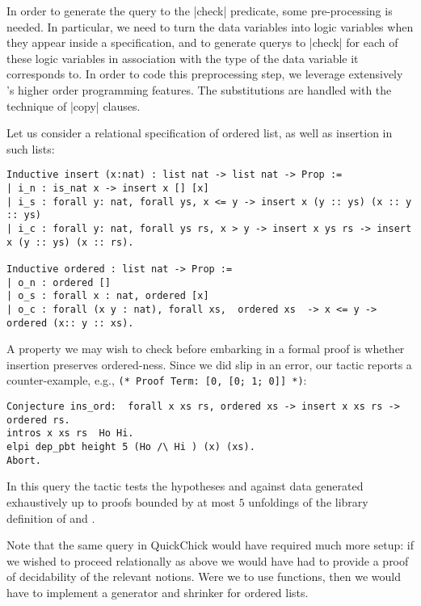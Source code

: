 In order to generate the query to the \lsti|check| predicate, some pre-processing is needed. In particular, we need to
turn the data variables into \lP logic variables when they appear inside a specification, and to generate querys to
\lsti|check| for each of these logic variables in association with the type of the data variable it corresponds to.
In order to code this preprocessing step, we leverage extensively \lP's higher order programming features. The substitutions
are handled with the technique of \lsti|copy| clauses.

Let us consider a  relational specification of ordered list, as well as insertion in such lists:
\begin{lstlisting}
Inductive insert (x:nat) : list nat -> list nat -> Prop :=
| i_n : is_nat x -> insert x [] [x]
| i_s : forall y: nat, forall ys, x <= y -> insert x (y :: ys) (x :: y :: ys)
| i_c : forall y: nat, forall ys rs, x > y -> insert x ys rs -> insert x (y :: ys) (x :: rs).

Inductive ordered : list nat -> Prop :=
| o_n : ordered []
| o_s : forall x : nat, ordered [x]
| o_c : forall (x y : nat), forall xs,  ordered xs  -> x <= y -> ordered (x:: y :: xs).     
\end{lstlisting}
%
A property we may wish to check before embarking in a formal proof is whether insertion preserves ordered-ness. Since we did slip in an error, our tactic reports a counter-example, e.g.,
\verb|(* Proof Term: [0, [0; 1; 0]] *)|:
\begin{lstlisting}
Conjecture ins_ord:  forall x xs rs, ordered xs -> insert x xs rs -> ordered rs.
intros x xs rs  Ho Hi.
elpi dep_pbt height 5 (Ho /\ Hi ) (x) (xs).
Abort.
\end{lstlisting}
In this query the tactic tests the hypotheses  and 
against data  generated exhaustively up to proofs bounded by
at most $5$ unfoldings of the library  definition of
 and .

Note that the same query in \textsf{QuickChick} would have required much more setup: if we wished to proceed relationally as above we would have had to provide a proof of decidability of the relevant notions. Were we to use functions, then we would have to implement a generator and shrinker for ordered lists.


